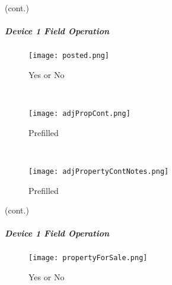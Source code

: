 {\footnotesize (cont.)}
\vspace{.5in}

\vspace{2.25in}

\vspace{3.25in}

\noindent{} {\LARGE\lookArrow}
\clearpage

\subparagraph*{Device 1 Field Operation}
\begin{wrapfigure}{r}{0.4\textwidth}
\centering
    \texttt{[image: posted.png]} %
\caption{Yes or No}
\vspace{.05in}

\HRule \\[.4cm] %
\vspace{.1in}

    \texttt{[image: adjPropCont.png]} %
\caption{Prefilled}
\vspace{.05in}

\HRule \\[.4cm] %
\vspace{.1in}

    \texttt{[image: adjPropertyContNotes.png]}
\caption{Prefilled}
\end{wrapfigure}



{\footnotesize (cont.)}
\vspace{.5in}

\noindent{} {\LARGE\lookArrow}
\vspace{2.75in}

\noindent{} {\LARGE\lookArrow}
\vspace{3in}

\noindent{} {\LARGE\lookArrow}


\clearpage

\subparagraph*{Device 1 Field Operation}
\begin{wrapfigure}{r}{0.4\textwidth}
\centering
    \texttt{[image: propertyForSale.png]}
\caption{Yes or No}
\end{wrapfigure}

